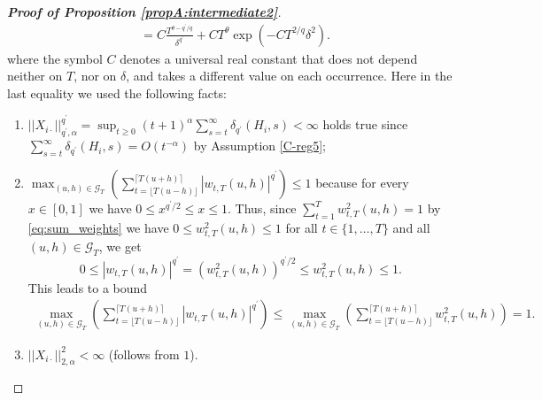 \begin{proof}[\textnormal{\textbf{Proof of Proposition \ref{propA:intermediate2}}}]
{\begin{align*}
&= C \frac{ T^{\theta - q^\prime/q}}{\delta^{q^\prime}} + C T^\theta \exp \left(-C T^{2/q} \delta^2\right).
\end{align*}}
where the symbol $C$ denotes a universal real constant that does not depend neither on $T$, nor on $\delta$, and takes a different value on each occurrence. Here in the last equality we used the following facts:
\begin{enumerate}
	\item $||X_{i\cdot}||^{q^\prime}_{q^\prime, \alpha} = \sup_{t\geq 0} (t+1)^{\alpha} \sum_{s=t}^{\infty} \delta_{q^\prime}(H_{i}, s)  < \infty$ holds true since $\sum_{s=t}^{\infty}\delta_{q^\prime}(H_{i}, s) = O(t^{-\alpha})$ by Assumption \ref{C-reg5};
	\item $\max_{(u, h) \in \mathcal{G}_T} \left( \sum_{t=\lfloor T(u-h) \rfloor}^{\lceil T(u+h) \rceil} |w_{t,T}(u,h)|^{q^\prime}\right) \leq 1$ because for every $x \in [0, 1]$ we have $ 0 \leq x^{q^\prime/2} \leq x \leq 1$. Thus, since $\sum_{t=1}^{T} w^2_{t,T}(u,h) = 1$ by \eqref{eq:sum_weights} we have \linebreak $0 \leq w^2_{t,T}(u,h) \leq 1$ for all $t\in \{1, \ldots, T\}$ and all $(u, h) \in \mathcal{G}_T$, we get
$$ 0 \leq |w_{t,T}(u,h)|^{q^\prime} =  (w^2_{t,T}(u,h))^{q^\prime/2} \leq w^2_{t,T}(u,h) \leq 1.$$
This leads to a bound  
\begin{align*}
\max_{(u, h) \in \mathcal{G}_T} \left( \sum_{t=\lfloor T(u-h) \rfloor}^{\lceil T(u+h) \rceil} |w_{t,T}(u,h)|^{q^\prime}\right) \leq
\max_{(u, h) \in \mathcal{G}_T} \left( \sum_{t=\lfloor T(u-h) \rfloor}^{\lceil T(u+h) \rceil} w_{t,T}^2(u,h)\right) =1.
\end{align*}
	\item $||X_{i\cdot}||^{2}_{2, \alpha} < \infty$ (follows from $1$).
\end{enumerate}



\end{proof}
